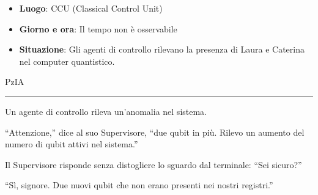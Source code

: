 \begin{center}
\begin{minipage}{0.7\textwidth}
    \centering
    
\end{minipage}
\end{center}
\newpage
\begin{tcolorbox}[colback=gray!5,colframe=gray!80,title=\textbf{Scheda Informativa}]
\begin{itemize}
    \item \textbf{Luogo}: CCU (Classical Control Unit)
    \item \textbf{Giorno e ora}: Il tempo non è osservabile
    \item \textbf{Situazione}: Gli agenti di controllo rilevano la presenza di Laura e Caterina nel computer quantistico.
\end{itemize}
\end{tcolorbox}

\vspace{1em}
\begin{center}PzIA\end{center}
\hrule
\vspace{1em}
Un agente di controllo rileva un'anomalia nel sistema.

``Attenzione,'' dice al suo Supervisore, ``due qubit in più. Rilevo un aumento del numero di qubit attivi nel sistema.''

Il Supervisore risponde senza distogliere lo sguardo dal terminale: ``Sei sicuro?''

``Sì, signore. Due nuovi qubit che non erano presenti nei nostri registri.''

